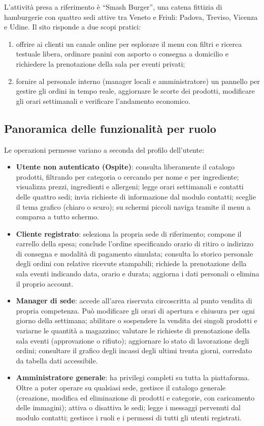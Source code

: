 \documentclass[a4paper,11pt]{article}
\begin{document}
L'attività presa a riferimento è ``Smash Burger'', una catena fittizia di hamburgerie con quattro sedi attive tra Veneto e Friuli: Padova, Treviso, Vicenza e Udine. Il sito risponde a due scopi pratici:
\begin{enumerate}
    \item offrire ai clienti un canale online per esplorare il menu con filtri e ricerca testuale libera, ordinare panini con asporto o consegna a domicilio e richiedere la prenotazione della sala per eventi privati;
    \item fornire al personale interno (manager locali e amministratore) un pannello per gestire gli ordini in tempo reale, aggiornare le scorte dei prodotti, modificare gli orari settimanali e verificare l'andamento economico.
\end{enumerate}

\subsection{Panoramica delle funzionalità per ruolo}
Le operazioni permesse variano a seconda del profilo dell'utente:

\begin{itemize}
    \item \textbf{Utente non autenticato (Ospite)}: consulta liberamente il catalogo prodotti, filtrando per categoria o cercando per nome e per ingrediente; visualizza prezzi, ingredienti e allergeni; legge orari settimanali e contatti delle quattro sedi; invia richieste di informazione dal modulo contatti; sceglie il tema grafico (chiaro o scuro); su schermi piccoli naviga tramite il menu a comparsa a tutto schermo.
    \item \textbf{Cliente registrato}: seleziona la propria sede di riferimento; compone il carrello della spesa; conclude l'ordine specificando orario di ritiro o indirizzo di consegna e modalità di pagamento simulata; consulta lo storico personale degli ordini con relative ricevute stampabili; richiede la prenotazione della sala eventi indicando data, orario e durata; aggiorna i dati personali o elimina il proprio account.
    \item \textbf{Manager di sede}: accede all'area riservata circoscritta al punto vendita di propria competenza. Può modificare gli orari di apertura e chiusura per ogni giorno della settimana; abilitare o sospendere la vendita dei singoli prodotti e variarne le quantità a magazzino; valutare le richieste di prenotazione della sala eventi (approvazione o rifiuto); aggiornare lo stato di lavorazione degli ordini; consultare il grafico degli incassi degli ultimi trenta giorni, corredato da tabella dati accessibile.
    \item \textbf{Amministratore generale}: ha privilegi completi su tutta la piattaforma. Oltre a poter operare su qualsiasi sede, gestisce il catalogo generale (creazione, modifica ed eliminazione di prodotti e categorie, con caricamento delle immagini); attiva o disattiva le sedi; legge i messaggi pervenuti dal modulo contatti; gestisce i ruoli e i permessi di tutti gli utenti registrati.
\end{itemize}
\end{document}
